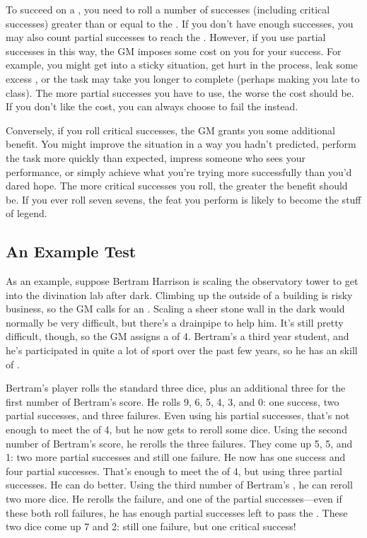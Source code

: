 To succeed on a {\test}, you need to roll a number of successes (including critical successes) greater than or equal to the {\targetnumber}.
If you don't have enough successes, you may also count partial successes to reach the {\tn}.
However, if you use partial successes in this way, the GM imposes some cost on you for your success.
For example, you might get into a sticky situation, get hurt in the process, leak some excess {\mana}, or the task may take you longer to complete (perhaps making you late to class).
The more partial successes you have to use, the worse the cost should be.
If you don't like the cost, you can always choose to fail the {\test} instead.

Conversely, if you roll critical successes, the GM grants you some additional benefit.
You might improve the situation in a way you hadn't predicted, perform the task more quickly than expected, impress someone who sees your performance, or simply achieve what you're trying more successfully than you'd dared hope.
The more critical successes you roll, the greater the benefit should be.
If you ever roll seven sevens, the feat you perform is likely to become the stuff of legend.

\subsection{An Example Test}

As an example, suppose Bertram Harrison is scaling the observatory tower to get into the divination lab after dark.
Climbing up the outside of a building is risky business, so the GM calls for an  {\test}.
Scaling a sheer stone wall in the dark would normally be very difficult, but there's a drainpipe to help him.
It's still pretty difficult, though, so the GM assigns a {\tn} of 4.
Bertram's a third year student, and he's participated in quite a lot of sport over the past few years, so he has an  skill of .

Bertram's player rolls the standard three dice, plus an additional three for the first number of Bertram's  score.
He rolls 9, 6, 5, 4, 3, and 0: one success, two partial successes, and three failures.
Even using his partial successes, that's not enough to meet the {\tn} of 4, but he now gets to reroll some dice.
Using the second number of Bertram's  score, he rerolls the three failures.
They come up 5, 5, and 1: two more partial successes and still one failure.
He now has one success and four partial successes.
That's enough to meet the {\tn} of 4, but using three partial successes.
He can do better.
Using the third number of Bertram's , he can reroll two more dice.
He rerolls the failure, and one of the partial successes---even if these both roll failures, he has enough partial successes left to pass the {\test}.
These two dice come up 7 and 2: still one failure, but one critical success!

